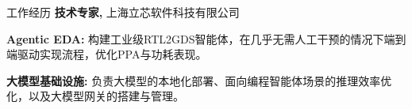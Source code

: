 
\begin{rubric}{工作经历}
	\entry*[2026/7 -- 至今]%
	\textbf{技术专家,} 上海立芯软件科技有限公司
	\par \textbf{Agentic EDA:} 构建工业级RTL2GDS智能体，在几乎无需人工干预的情况下端到端驱动实现流程，优化PPA与功耗表现。
	\par \textbf{大模型基础设施:} 负责大模型的本地化部署、面向编程智能体场景的推理效率优化，以及大模型网关的搭建与管理。
\end{rubric}
